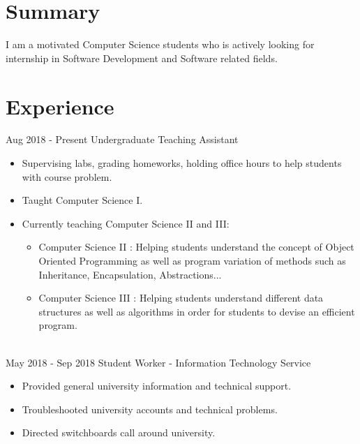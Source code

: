\documentclass[letterpaper]{twentysecondcv} %
\begin{document}
\makeprofile %
 \section{Summary}
    I am a motivated Computer Science students who is actively looking for internship in Software Development and Software related fields.

\section{Experience}

\begin{twenty} %
\twentyitem
    	{Aug 2018 -}
		{Present}
        {Undergraduate Teaching Assistant}
        {}
        {}
        {\begin{itemize}
        \item Supervising labs, grading homeworks, holding office hours to help students with course problem.
        \item Taught Computer Science I.
        \item Currently teaching Computer Science II and III:
            \begin{itemize}
                \item Computer Science II : Helping students understand the concept of Object Oriented Programming as well as program
                variation of methods such as Inheritance, Encapsulation, Abstractions... 
                \item Computer Science III : Helping students understand different data structures as well as algorithms in order for
                students to devise an efficient program.
            \end{itemize}
        \end{itemize}}
        \\
	\twentyitem
    	{May 2018 -}
		{Sep 2018}
        {Student Worker - Information Technology Service}
        {}
        {}
        {
        {\begin{itemize}
        \item Provided general university information and technical support.
        \item Troubleshooted university accounts and technical problems.
        \item Directed switchboards call around university.
    \end{itemize}}
        }
    
        
\end{twenty}
\end{document}

